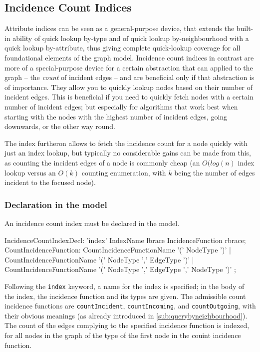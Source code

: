 \subsection{Incidence Count Indices}
Attribute indices can be seen as a general-purpose device, that extends the built-in ability of quick lookup by-type and of quick lookup by-neighbourhood with a quick lookup by-attribute, thus giving complete quick-lookup coverage for all foundational elements of the graph model.
Incidence count indices in contrast are more of a special-purpose device for a certain abstraction that can applied to the graph -- the \emph{count} of incident edges -- and are beneficial only if that abstraction is of importance.
They allow you to quickly lookup nodes based on their number of incident edges.
This is beneficial if you need to quickly fetch nodes with a certain number of incident edges;
but especially for algorithms that work best when starting with the nodes with the highest number of incident edges, going downwards, or the other way round.

The index furtheron allows to fetch the incidence count for a node quickly with just an index lookup, 
but typically no considerable gains can be made from this, as counting the incident edges of a node is commonly cheap (an $O(log(n)$ index lookup versus an $O(k)$ counting enumeration, with $k$ being the number of edges incident to the focused node).

\subsubsection*{Declaration in the model}

An incidence count index must be declared in the model.

\begin{rail}
IncidenceCountIndexDecl: 'index' IndexName lbrace IncidenceFunction rbrace;
CountIncidenceFunction: 
  CountIncidenceFunctionName '(' NodeType ')' |
  CountIncidenceFunctionName '(' NodeType ',' EdgeType ')' |
  CountIncidenceFunctionName '(' NodeType ',' EdgeType ',' NodeType ')'
  ;
\end{rail}\label{IncidenceCountIndexDecl}

Following the \texttt{index} keyword, a name for the index is specified; in the body of the index, the incidence function and its types are given.
The admissible count incidence functions are \texttt{countIncident}, \texttt{countIncoming}, and \texttt{countOutgoing}, with their obvious meanings (as already introduced in \ref{sub:querybyneighbourhood}).
The count of the edges complying to the specified incidence function is indexed, for all nodes in the graph of the type of the first node in the couint incidence function.

